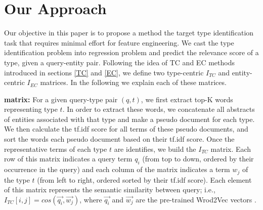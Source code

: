 \section{Our Approach}
Our objective in this paper is to propose a method the target type identification task that requires minimal effort for feature engineering.  We cast the type identification problem into regression problem and predict the relevance score of a type, given a query-entity pair.
Following the idea of TC and EC methods introduced in sections \ref{TC} and \ref{EC}, we define two type-centric $I_{TC}$ and entity-centric $I_{EC}$ matrices.  In the following we explain each of these matrices.%



 \textbf{matrix:} For a given query-type pair $(q,t)$, we first extract top-K words representing type $t$. In order to extract these words, we concatenate all abstracts of entities associated with that type and make a pseudo document for each type. We then calculate the tf.idf score for all terms of these pseudo documents, and sort the words each  pseudo document based on their tf.idf score. Once the representative terms of each type $t$ are identifies, we build the $I_{TC}$ matrix. Each row of this matrix indicates a query term $q_i$ (from top to down, ordered by their occurrence in the query) and each column of the matrix indicates a term $w_j$ of the type $t$ (from left to right, ordered sorted by their tf.idf score). Each element of this matrix represents the semantic similarity between query; i.e.,  $I_{TC}[i,j] = cos(\vec{q_i}, \vec{w_j})$, where $\vec{q_i}$ and $\vec{w_j}$ are the pre-trained Wrod2Vec vectors \cite{Mikolov:2013:DRW:2999792.2999959}.

